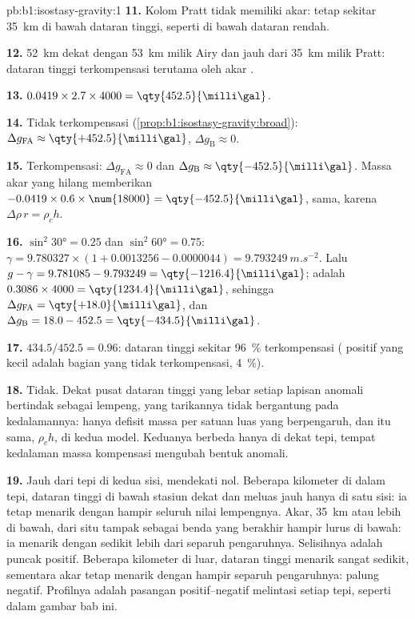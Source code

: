 \begin{solution}{pb:b1:isostasy-gravity:1}
\textbf{11.} Kolom Pratt tidak memiliki akar:  tetap sekitar \qty{35}{km}
di bawah dataran tinggi, seperti di bawah dataran rendah.

\textbf{12.} \qty{52}{km} dekat dengan \qty{53}{km} milik Airy dan jauh dari
\qty{35}{km} milik Pratt: dataran tinggi terkompensasi terutama oleh akar .

\textbf{13.} $0.0419\times2.7\times4000 = \qty{452.5}{\milli\gal}$.

\textbf{14.} Tidak terkompensasi (\cref{prop:b1:isostasy-gravity:broad}):
$\Delta g_{\mathrm{FA}} \approx \qty{+452.5}{\milli\gal}$,
$\Delta g_{\mathrm B} \approx 0$.

\textbf{15.} Terkompensasi: $\Delta g_{\mathrm{FA}} \approx 0$ dan
$\Delta g_{\mathrm B} \approx \qty{-452.5}{\milli\gal}$. Massa akar yang hilang
memberikan $-0.0419\times0.6\times\num{18000} = \qty{-452.5}{\milli\gal}$, sama,
karena $\Delta\rho\,r = \rho_c h$.

\textbf{16.} $\sin^2\ang{30} = 0.25$ dan $\sin^2\ang{60} = 0.75$:
$\gamma = 9.780327\times(1 + 0.0013256 - 0.0000044) = \qty{9.793249}{m.s^{-2}}$.
Lalu $g - \gamma = 9.781085 - 9.793249 = \qty{-1216.4}{\milli\gal}$; 
adalah $0.3086\times4000 = \qty{1234.4}{\milli\gal}$, sehingga
$\Delta g_{\mathrm{FA}} = \qty{+18.0}{\milli\gal}$, dan
$\Delta g_{\mathrm B} = 18.0 - 452.5 = \qty{-434.5}{\milli\gal}$.

\textbf{17.} $434.5/452.5 = 0.96$: dataran tinggi sekitar \qty{96}{\percent} terkompensasi
( positif yang kecil adalah bagian yang tidak terkompensasi,
\qty{4}{\percent}).

\textbf{18.} Tidak. Dekat pusat dataran tinggi yang lebar setiap lapisan anomali bertindak
sebagai lempeng, yang tarikannya tidak bergantung pada kedalamannya: hanya defisit massa
per satuan luas yang berpengaruh, dan itu sama, $\rho_c h$, di kedua model. Keduanya
berbeda hanya di dekat tepi, tempat kedalaman massa kompensasi mengubah
bentuk anomali.

\textbf{19.} Jauh dari tepi di kedua sisi,  mendekati nol.
Beberapa kilometer di dalam tepi, dataran tinggi di bawah stasiun dekat dan
meluas jauh hanya di satu sisi: ia tetap menarik dengan hampir seluruh nilai lempengnya.
Akar, \qty{35}{km} atau lebih di bawah, dari situ tampak sebagai benda yang berakhir
hampir lurus di bawah: ia menarik dengan sedikit lebih dari separuh pengaruhnya. Selisihnya
adalah puncak positif. Beberapa kilometer di luar, dataran tinggi menarik
sangat sedikit, sementara akar tetap menarik dengan hampir separuh pengaruhnya: palung negatif.
Profilnya adalah pasangan positif--negatif melintasi setiap tepi, seperti dalam
gambar bab ini.


\end{solution}
